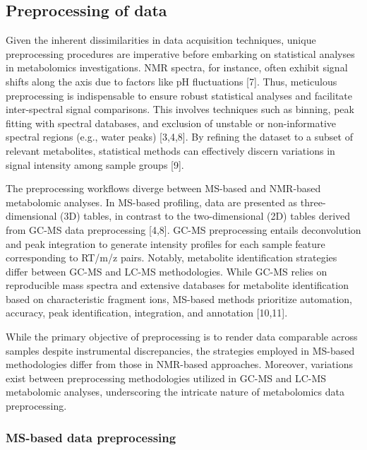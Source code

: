 \documentclass[ENG, BIB]{TFUOC}%
\begin{document}
\subsection{Preprocessing of data}

Given the inherent dissimilarities in data acquisition techniques, unique preprocessing procedures are imperative before embarking on statistical analyses in metabolomics investigations. NMR spectra, for instance, often exhibit signal shifts along the axis due to factors like pH fluctuations [7]. Thus, meticulous preprocessing is indispensable to ensure robust statistical analyses and facilitate inter-spectral signal comparisons. This involves techniques such as binning, peak fitting with spectral databases, and exclusion of unstable or non-informative spectral regions (e.g., water peaks) [3,4,8]. By refining the dataset to a subset of relevant metabolites, statistical methods can effectively discern variations in signal intensity among sample groups [9].


The preprocessing workflows diverge between MS-based and NMR-based metabolomic analyses. In MS-based profiling, data are presented as three-dimensional (3D) tables, in contrast to the two-dimensional (2D) tables derived from GC-MS data preprocessing [4,8]. GC-MS preprocessing entails deconvolution and peak integration to generate intensity profiles for each sample feature corresponding to {RT/m/z} pairs. Notably, metabolite identification strategies differ between GC-MS and LC-MS methodologies. While GC-MS relies on reproducible mass spectra and extensive databases for metabolite identification based on characteristic fragment ions, MS-based methods prioritize automation, accuracy, peak identification, integration, and annotation [10,11].


While the primary objective of preprocessing is to render data comparable across samples despite instrumental discrepancies, the strategies employed in MS-based methodologies differ from those in NMR-based approaches. Moreover, variations exist between preprocessing methodologies utilized in GC-MS and LC-MS metabolomic analyses, underscoring the intricate nature of metabolomics data preprocessing.


\subsubsection{MS-based data preprocessing}
\end{document}
